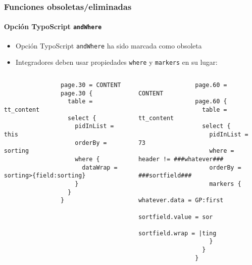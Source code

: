 \begin{frame}[fragile]
	\frametitle{Funciones obsoletas/eliminadas}
	\framesubtitle{Opción TypoScript \texttt{andWhere}}

	\lstset{basicstyle=\tiny\ttfamily}

	\begin{itemize}
		\item Opción TypoScript \texttt{andWhere} ha sido marcada como obsoleta
		\item Integradores deben usar propiedades \texttt{where} y \texttt{markers} en su lugar:
	\end{itemize}

	\begin{columns}[T]
		\begin{column}{.6\textwidth}

			\lstset{xleftmargin=1cm}

			\begin{lstlisting}
				page.30 = CONTENT
				page.30 {
				  table = tt_content
				  select {
				    pidInList = this
				    orderBy = sorting
				    where {
				      dataWrap = sorting>{field:sorting}
				    }
				  }
				}
			\end{lstlisting}
		\end{column}
		\begin{column}{.4\textwidth}
			\begin{lstlisting}
				page.60 = CONTENT
				page.60 {
				  table = tt_content
				  select {
				    pidInList = 73
				    where = header != ###whatever###
				    orderBy = ###sortfield###
				    markers {
				      whatever.data = GP:first
				      sortfield.value = sor
				      sortfield.wrap = |ting
				    }
				  }
				}
			\end{lstlisting}
		\end{column}
	\end{columns}

\end{frame}


